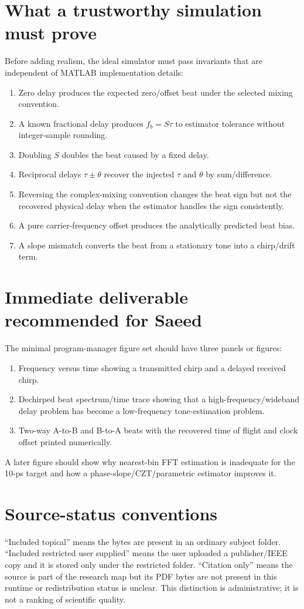 \documentclass[11pt]{article}
\begin{document}
\section{What a trustworthy simulation must prove}
Before adding realism, the ideal simulator must pass invariants that are independent of MATLAB implementation details:
\begin{enumerate}
\item Zero delay produces the expected zero/offset beat under the selected mixing convention.
\item A known fractional delay produces $f_b=S\tau$ to estimator tolerance without integer-sample rounding.
\item Doubling $S$ doubles the beat caused by a fixed delay.
\item Reciprocal delays $\tau\pm\theta$ recover the injected $\tau$ and $\theta$ by sum/difference.
\item Reversing the complex-mixing convention changes the beat sign but not the recovered physical delay when the estimator handles the sign consistently.
\item A pure carrier-frequency offset produces the analytically predicted beat bias.
\item A slope mismatch converts the beat from a stationary tone into a chirp/drift term.
\end{enumerate}

\section{Immediate deliverable recommended for Saeed}
The minimal program-manager figure set should have three panels or figures:
\begin{enumerate}
\item Frequency versus time showing a transmitted chirp and a delayed received chirp.
\item Dechirped beat spectrum/time trace showing that a high-frequency/wideband delay problem has become a low-frequency tone-estimation problem.
\item Two-way A-to-B and B-to-A beats with the recovered time of flight and clock offset printed numerically.
\end{enumerate}
A later figure should show why nearest-bin FFT estimation is inadequate for the 10-ps target and how a phase-slope/CZT/parametric estimator improves it.

\section{Source-status conventions}
``Included topical'' means the bytes are present in an ordinary subject folder. ``Included restricted user supplied'' means the user uploaded a publisher/IEEE copy and it is stored only under the restricted folder. ``Citation only'' means the source is part of the research map but its PDF bytes are not present in this runtime or redistribution status is unclear. This distinction is administrative; it is not a ranking of scientific quality.
\end{document}
